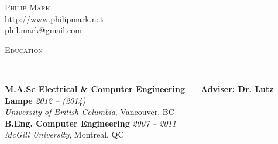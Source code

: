 \documentclass[10pt]{article}
\newenvironment{changemargin}[2]{%
  \begin{list}{}{%
    \setlength{\topsep}{0pt}%
    \setlength{\leftmargin}{#1}%
    \setlength{\rightmargin}{#2}%
    \setlength{\listparindent}{\parindent}%
    \setlength{\itemindent}{\parindent}%
    \setlength{\parsep}{\parskip}%
  }%
  \item[]}{\end{list}
}
\newcommand{\lineover}{
  \begin{changemargin}{-0.05in}{-0.05in}
    \vspace*{-8pt}
    \hrulefill \\
    \vspace*{-2pt}
  \end{changemargin}
}
\renewcommand{\section}[1]{
  \begin{changemargin}{-0.5in}{-0.5in}
    \normalsize \scshape{#1}\\
    \lineover
  \end{changemargin}
}
\newcommand{\contact}[3]{
  \begin{changemargin}{-0.5in}{-0.5in}
    \begin{center}
      {\LARGE \scshape {#1}}\\ \smallskip
      {\url{#2}}\\ \smallskip
      {\href{mailto:#3}{#3}}\\ \smallskip
    \end{center}
  \end{changemargin}
}
\newenvironment{body} {
  \vspace{2pt}
  \begin{changemargin}{-0.25in}{-0.5in}
    }{
  \end{changemargin}
}
\begin{document}
\contact{Philip Mark}{http://www.philipmark.net}{phil.mark@gmail.com}

% 
% 

\section{Education}
\begin{body}
\textbf{M.A.Sc Electrical \& Computer Engineering --- Adviser: Dr. Lutz Lampe}
\hfill \emph{2012 -- (2014)}{} \\
\emph{University of British Columbia}, Vancouver, BC \\
\medskip
\textbf{B.Eng. Computer Engineering} \hfill \emph{2007 -- 2011} \\ \emph{McGill
University}, Montreal, QC \\
\end{body}
\bigskip

\end{document}
